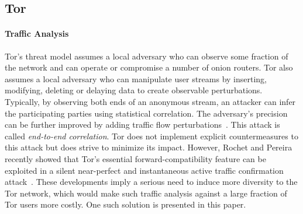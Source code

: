 \subsection{Tor}


\paragraph*{Traffic Analysis}
Tor's threat model assumes a local adversary who can observe some fraction of
the network and can operate or compromise a number of onion routers. Tor also
assumes a local adversary who can manipulate user streams by inserting,
modifying, deleting or delaying data to create observable
perturbations. Typically, by observing both ends of an anonymous stream, an
attacker can infer the participating parties using statistical correlation. The
adversary's precision can be further improved by adding traffic flow
perturbations~\cite{fu2009one}. This attack is called \textit{end-to-end correlation}. Tor does
not implement explicit countermeasures to this attack but does strive to
minimize its impact. However, Rochet and Pereira recently showed that Tor's
essential forward-compatibility feature can be exploited in a silent
near-perfect and instantaneous active traffic confirmation
attack~\cite{rochet2018dropping}. These developments imply a serious need to
induce more diversity to the Tor network, which would make such traffic analysis
against a large fraction of Tor users more costly. One such solution is
presented in this paper.

